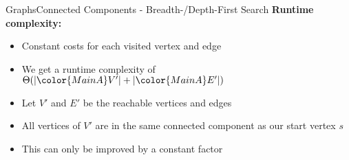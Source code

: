 \begin{frame}{Graphs}{Connected Components - Breadth-/Depth-First Search}
  \textbf{Runtime complexity:}
  \begin{itemize}
    \item
      Constant costs for each visited vertex and edge
    \item<2->
      We get a runtime complexity of
      \begin{math}
        \Theta(\vert {\color{MainA}V'} \vert
          + \vert {\color{MainA}E'} \vert)
      \end{math}
    \item<3->
      Let {\color{MainA}$V'$} and {\color{MainA}$E'$} be the
      reachable vertices and edges
    \item<4->
      All vertices of {\color{MainA}$V'$} are in the same connected
      component as our start vertex {\color{MainA}$s$}
    \item<5->
      This can only be improved by a constant factor
  \end{itemize}
\end{frame}
